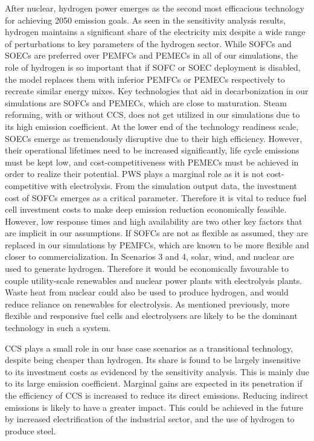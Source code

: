 After nuclear, hydrogen power emerges as the second most efficacious technology for achieving 2050 emission goals. As seen in the sensitivity analysis results, hydrogen maintains a significant share of the electricity mix despite a wide range of perturbations to key parameters of the hydrogen sector. While \gls{SOFC}s and \gls{SOEC}s are preferred over \gls{PEMFC}s and \gls{PEMEC}s in all of our simulations, the role of hydrogen is so important that if \gls{SOFC} or \gls{SOEC} deployment is disabled, the model replaces them with inferior \gls{PEMFC}s or \gls{PEMEC}s respectively to recreate similar energy mixes. Key technologies that aid in decarbonization in our simulations are \gls{SOFC}s and \gls{PEMEC}s, which are close to maturation. Steam reforming, with or without CCS, does not get utilized in our simulations due to its high emission coefficient. At the lower end of the technology readiness scale, \gls{SOEC}s emerge as tremendously disruptive due to their high efficiency. However, their operational lifetimes need to be increased significantly, life cycle emissions must be kept low, and cost-competitiveness with \gls{PEMEC}s must be achieved in order to realize their potential. \gls{PWS} plays a marginal role as it is not cost-competitive with electrolysis. From the simulation output data, the investment cost of \gls{SOFC}s emerges as a critical parameter. Therefore it is vital to reduce fuel cell investment costs to make deep emission reduction economically feasible. However, low response times and high availability are two other key factors that are implicit in our assumptions. If \gls{SOFC}s are not as flexible as assumed, they are replaced in our simulations by \gls{PEMFC}s, which are known to be more flexible and closer to commercialization. In Scenarios 3 and 4, solar, wind, and nuclear are used to generate hydrogen. Therefore it would be economically favourable to couple utility-scale renewables and nuclear power plants with electrolysis plants. Waste heat from nuclear could also be used to produce hydrogen, and would reduce reliance on renewables for electrolysis. As mentioned previously, more flexible and responsive fuel cells and electrolysers are likely to be the dominant technology in such a system.

CCS plays a small role in our base case scenarios as a transitional technology, despite being cheaper than hydrogen. Its share is found to be largely insensitive to its investment costs as evidenced by the sensitivity analysis. This is mainly due to its large emission coefficient. Marginal gains are expected in its penetration if the efficiency of CCS is increased to reduce its direct emissions. Reducing indirect emissions is likely to have a greater impact. This could be achieved in the future by increased electrification of the industrial sector, and the use of hydrogen to produce steel.


